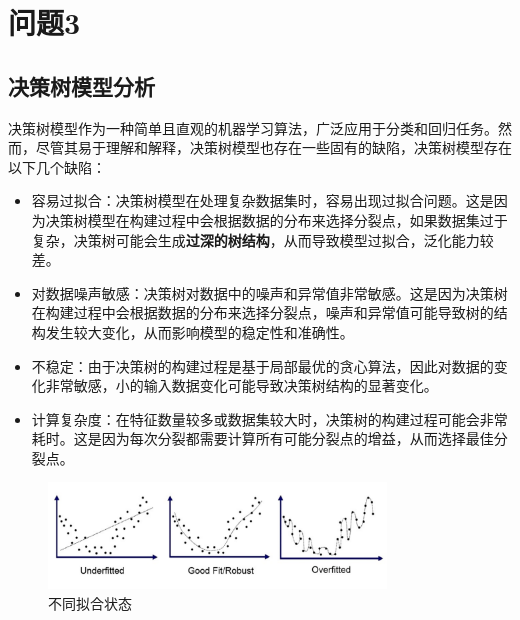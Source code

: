 
\section{问题3}
\subsection{决策树模型分析}
决策树模型作为一种简单且直观的机器学习算法，广泛应用于分类和回归任务。然而，尽管其易于理解和解释，决策树模型也存在一些固有的缺陷，决策树模型存在以下几个缺陷：
\begin{itemize}
	\item 容易过拟合：决策树模型在处理复杂数据集时，容易出现过拟合问题。这是因为决策树模型在构建过程中会根据数据的分布来选择分裂点，如果数据集过于复杂，决策树可能会生成\textbf{过深的树结构}，从而导致模型过拟合，泛化能力较差。

	\item 对数据噪声敏感：决策树对数据中的噪声和异常值非常敏感。这是因为决策树在构建过程中会根据数据的分布来选择分裂点，噪声和异常值可能导致树的结构发生较大变化，从而影响模型的稳定性和准确性。
	\item 不稳定：由于决策树的构建过程是基于局部最优的贪心算法，因此对数据的变化非常敏感，小的输入数据变化可能导致决策树结构的显著变化。
	\item 计算复杂度：在特征数量较多或数据集较大时，决策树的构建过程可能会非常耗时。这是因为每次分裂都需要计算所有可能分裂点的增益，从而选择最佳分裂点。
\end{itemize}
\begin{figure}[H]
	\centering
	\includegraphics[width=0.8\textwidth]{figures/fit_status.png}
	\caption{不同拟合状态}
	\label{fig:fit_status}
\end{figure}

